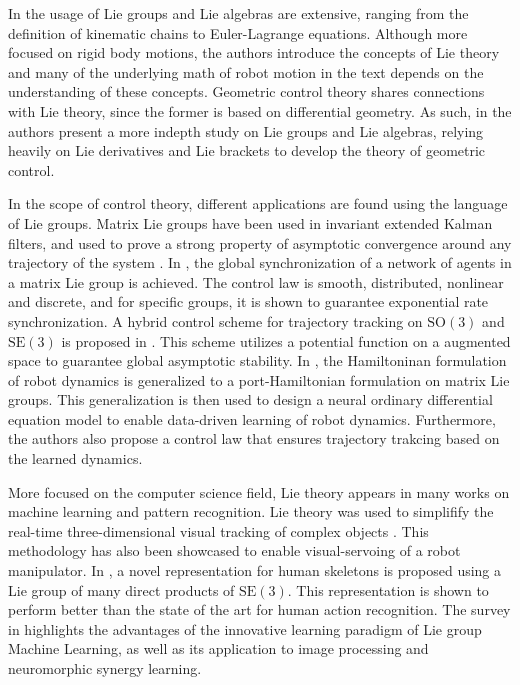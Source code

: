 In \citet{Murray1994} the usage of Lie groups and Lie algebras are extensive, ranging from the definition of kinematic chains to Euler-Lagrange equations. Although more focused on rigid body motions, the authors introduce the concepts of Lie theory and many of the underlying math of robot motion in the text depends on the understanding of these concepts. Geometric control theory shares connections with Lie theory, since the former is based on differential geometry. As such, in \citet{Bullo2004} the authors present a more indepth study on Lie groups and Lie algebras, relying heavily on Lie derivatives and Lie brackets to develop the theory of geometric control. 

In the scope of control theory, different applications are found using the language of Lie groups. Matrix Lie groups have been used in invariant extended Kalman filters, and used to prove a strong property of asymptotic convergence around any trajectory of the system \citep{Barrau2017}. In \citet{Mccarthy2020}, the global synchronization of a network of agents in a matrix Lie group is achieved. The control law is smooth, distributed, nonlinear and discrete, and for specific groups, it is shown to guarantee exponential rate synchronization. A hybrid control scheme for trajectory tracking on $\text{SO}(3)$ and $\text{SE}(3)$ is proposed in \citet{Wang2022}. This scheme utilizes a potential function on a augmented space to guarantee global asymptotic stability. In \citet{Duong2024}, the Hamiltoninan formulation of robot dynamics is generalized to a port-Hamiltonian formulation on matrix Lie groups. This generalization is then used to design a neural ordinary differential equation model to enable data-driven learning of robot dynamics. Furthermore, the authors also propose a control law that ensures trajectory trakcing based on the learned dynamics.

More focused on the computer science field, Lie theory appears in many works on machine learning and pattern recognition. Lie theory was used to simplifify the real-time three-dimensional visual tracking of complex objects \citep{Drummond2002}. This methodology has also been showcased to enable visual-servoing of a robot manipulator. In \citet{Vemulapalli2014}, a novel representation for human skeletons is proposed using a Lie group of many direct products of $\text{SE}(3)$. This representation is shown to perform better than the state of the art for human action recognition. The survey in \citet{Lu2020} highlights the advantages of the innovative learning paradigm of Lie group Machine Learning, as well as its application to image processing and neuromorphic synergy learning.

